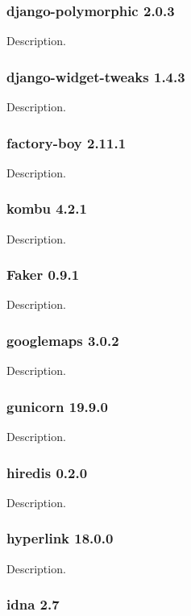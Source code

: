 \subsubsection{django-polymorphic 2.0.3}

Description.

\subsubsection{django-widget-tweaks 1.4.3}

Description.

\subsubsection{factory-boy 2.11.1}

Description.

\subsubsection{kombu 4.2.1}

Description.

\subsubsection{Faker 0.9.1}

Description.

\subsubsection{googlemaps 3.0.2}

Description.

\subsubsection{gunicorn 19.9.0}

Description.

\subsubsection{hiredis 0.2.0}

Description.

\subsubsection{hyperlink 18.0.0}

Description.

\subsubsection{idna 2.7}

